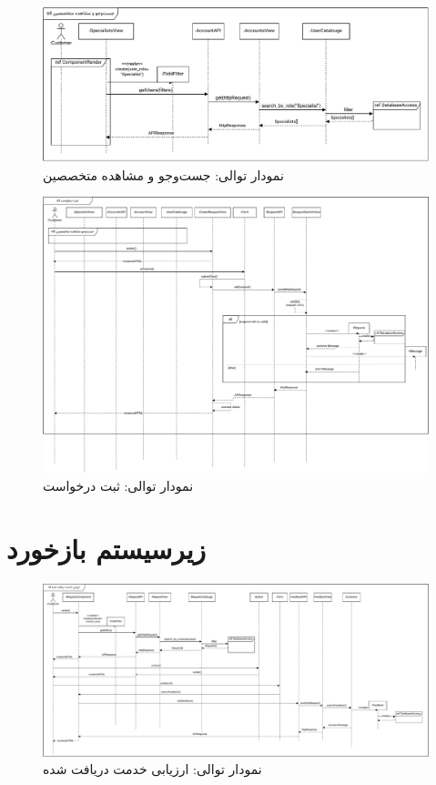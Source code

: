 \begin{figure}[ht!]
	\centering
	\includegraphics[scale=0.8]{figs/design-sequence/3-17.pdf}
	\caption{نمودار توالی: جست‌وجو و مشاهده متخصصین}
\end{figure}
\FloatBarrier
\newpage

\eject \pdfpagewidth=15in \pdfpageheight=12in

\begin{figure}[ht!]
	\centering
	\includegraphics[scale=0.8]{figs/design-sequence/3-18.pdf}
	\caption{نمودار توالی: ثبت درخواست}
\end{figure}
\FloatBarrier
\newpage



\section{زیرسیستم بازخورد}

\eject \pdfpagewidth=17in \pdfpageheight=8in

\begin{figure}[ht!]
	\centering
	\includegraphics[scale=0.8]{figs/design-sequence/3-24.pdf}
	\caption{نمودار توالی: ارزیابی خدمت دریافت شده}
\end{figure}
\FloatBarrier
\newpage

